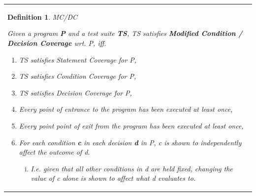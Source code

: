\documentclass{article}
\newcommand{\tmem}[1]{{\em #1\/}}
\newcommand{\tmstrong}[1]{\textbf{#1}}
\newenvironment{enumeratenumeric}{\begin{enumerate}[1.] }{\end{enumerate}}
\newenvironment{enumerateroman}{\begin{enumerate}[i.] }{\end{enumerate}}
\newenvironment{tmparmod}[3]{\begin{list}{}{\setlength{\topsep}{0pt}\setlength{\leftmargin}{#1}\setlength{\rightmargin}{#2}\setlength{\parindent}{#3}\setlength{\listparindent}{\parindent}\setlength{\itemindent}{\parindent}\setlength{\parsep}{\parskip}} \item[]}{\end{list}}
\newtheorem{definition}{Definition}
{\theorembodyfont{\rmfamily}\newtheorem{example}{Example}}
\begin{document}
\begin{tmparmod}{1cm}{0pt}{0pt}
  \begin{tmparmod}{0pt}{1cm}{0pt}
    {\noindent}{\noindent}\begin{tabular}{l}
      \begin{definition}
        MC/DC
        
        
        
        Given a program {\tmem{{\tmstrong{P{\tmstrong{}}}}}} and a test suite
        {\tmem{{\tmstrong{TS}}{\tmstrong{}}}}, TS satisfies
        {\tmstrong{Modified Condition / Decision Coverage}} wrt. P, iff.
        
        
        \begin{enumeratenumeric}
          \item TS satisfies Statement Coverage for P,
          
          \item TS satisfies Condition Coverage for P,
          
          \item TS satisfies Decision Coverage for P,
          
          \item Every point of entrance to the program has been executed at
          least once,
          
          \item Every point point of exit from the program has been executed
          at least once,
          
          \item For each condition {\tmem{{\tmstrong{c}}}} in each decision
          {\tmem{{\tmstrong{d}}}} in P, c is shown to independently affect the
          outcome of d.
          \begin{enumerateroman}
            \item I.e. given that all other conditions in d are held fixed,
            changing the value of c alone is shown to affect what d evaluates
            to. 
          \end{enumerateroman}
        \end{enumeratenumeric}
      \end{definition}
    \end{tabular}{\hspace*{\fill}}{\smallskip}
  \end{tmparmod}
\end{tmparmod}
\end{document}
